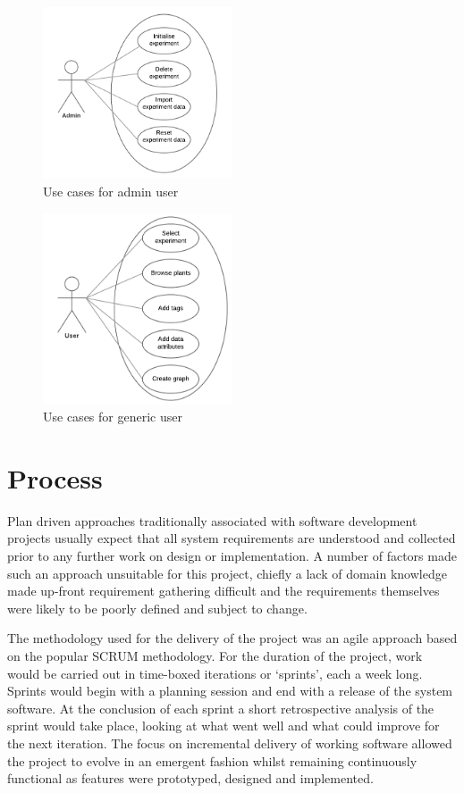 \begin{figure}[H]
    \centering
    \includegraphics[width=0.5\textwidth]{images/analysis/admin_case}
    \caption{Use cases for admin user}
    \label{fig:admin_case}
\end{figure}
\begin{figure}[H]
    \centering
    \includegraphics[width=0.5\textwidth]{images/analysis/user_case}
    \caption{Use cases for generic user}
    \label{fig:user_case}
\end{figure}

\section{Process}

Plan driven approaches traditionally associated with software development projects usually expect that all system requirements are understood and collected prior to any further work on design or implementation. A number of factors made such an approach unsuitable for this project, chiefly a lack of domain knowledge made up-front requirement gathering difficult and the requirements themselves were likely to be poorly defined and subject to change. 

The methodology used for the delivery of the project was an agile approach based on the popular SCRUM methodology. For the duration of the project, work would be carried out in time-boxed iterations or `sprints', each a week long. Sprints would begin with a planning session and end with a release of the system software. At the conclusion of each sprint a short retrospective analysis of the sprint would take place, looking at what went well and what could improve for the next iteration. The focus on incremental delivery of working software allowed the project to evolve in an emergent fashion whilst remaining continuously functional as features were prototyped, designed and implemented.  

